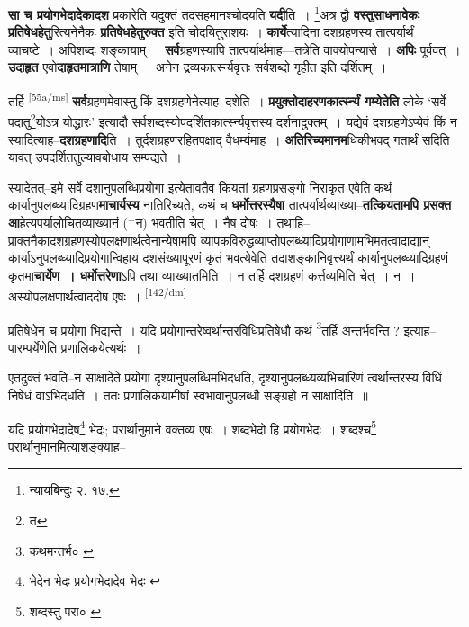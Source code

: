 \documentclass[article,12pt,a4paper]{memoir}
\newcommand{\add}[1]{($^{+}$#1)}
\begin{document}
	  \pstart \textbf{सा च प्रयोगभेदादेकादश} प्रकारेति यदुक्तं तदसहमानश्चोदयति \textbf{यदी}ति । \footnote{न्यायबिन्दुः २. १७.}अत्र द्वौ \textbf{वस्तुसाधनावेकः प्रतिषेधहेतु}रित्यनेनैकः \textbf{प्रतिषेधहेतुरुक्त} इति चोदयितुराशयः । \textbf{कार्ये}त्यादिना दशग्रहणस्य तात्पर्यार्थं व्याचष्टे । अपिशब्दः शङ्कायाम् । \textbf{सर्व}ग्रहणस्यापि तात्पर्यार्थमाह—तत्रेति वाक्योपन्यासे । \textbf{अपिः} पूर्ववत् । \textbf{उदाहृत} एवो\textbf{दाहृतमात्राणि} तेषाम् । अनेन द्रव्यकार्त्स्न्यवृत्तः सर्वशब्दो गृहीत इति दर्शितम् ।
	\pend
      

	  \pstart तर्हि \leavevmode\textsuperscript{\rmlatinfont\tiny [55a/ms]} \textbf{सर्व}ग्रहणमेवास्तु किं दशग्रहणेनेत्याह--दशेति । \textbf{प्रयुक्तोदाहरणकार्त्स्न्यं गम्येतेति} लोके ‘सर्वे पदातु\footnote{त}योऽत्र योद्धारः’ इत्यादौ सर्वशब्दस्योपदर्शितकार्त्स्न्यवृत्तस्य दर्शनादुक्तम् । यद्येवं दशग्रहणेऽप्येवं किं न स्यादित्याह--\textbf{दशग्रहणादि}ति । तुर्दशग्रहणरहितपक्षाद् वैधर्म्यमाह । \textbf{अतिरिच्यमानम}धिकीभवद् गतार्थं सदिति यावत् उपदर्शिततुल्यावबोधाय सम्पद्यते ।
	\pend
      

	  \pstart स्यादेतत्--इमे सर्वे दशानुपलब्धिप्रयोगा इत्येतावतैव कियतां ग्रहणप्रसङ्गो निराकृत एवेति कथं कार्यानुपलब्ध्यादिग्रहण\textbf{माचार्यस्य} नातिरिच्यते, कथं च \textbf{धर्मोत्तरस्यैषा} तात्पर्यार्थव्याख्या--\textbf{तत्कियतामपि प्रसक्त आ}हेत्यपर्यालोचितव्याख्यानं \add{न} भवतीति चेत् । नैष दोषः । तथाहि--प्राक्तनैकादशग्रहणस्योपलक्षणार्थत्वेनान्येषामपि व्यापकविरुद्धव्याप्तोपलब्ध्यादिप्रयोगाणामभिमतत्वादाद्यान् कार्याऽनुपलब्ध्यादिप्रयोगान्विहाय दशसंख्यापूरणं कृतं भवत्येवेति तदाशङ्कानिवृत्त्यर्थं कार्यानुपलब्ध्यादिग्रहणं कृतमा\textbf{चार्येण । धर्मोत्तरेणा}ऽपि तथा व्याख्यातमिति । न तर्हि दशग्रहणं कर्त्तव्यमिति चेत् । न । अस्योपलक्षणार्थत्वाददोष एषः ।  \leavevmode\textsuperscript{\rmlatinfont\tiny [142/dm]} 
	  
	प्रतिषेधेन च प्रयोगा भिद्यन्ते । यदि प्रयोगान्तरेष्वर्थान्तरविधिप्रतिषेधौ कथं \footnote{कथमन्तर्भ० \cite{dp-msC}}तर्हि अन्तर्भवन्ति ? इत्याह--पारम्पर्येणेति प्रणालिकयेत्यर्थः । 
	  
	एतदुक्तं भवति--न साक्षादेते प्रयोगा दृश्यानुपलब्धिमभिदधति, दृश्यानुपलब्ध्यव्यभिचारिणं त्वर्थान्तरस्य विधिं निषेधं वाऽभिदधति । ततः प्रणालिकयामीषां स्वभावानुपलब्धौ सङ्ग्रहो न साक्षादिति ॥ 
	  
	यदि प्रयोगभेदादेष\footnote{भेदेन भेदः \cite{dp-msA} \cite{dp-edP} \cite{dp-edH} \cite{dp-edE} \cite{dp-edN} प्रयोगभेदादेव भेदः \cite{dp-msB} \cite{dp-msC}} भेदः; परार्थानुमाने वक्तव्य एषः । शब्दभेदो हि प्रयोगभेदः । शब्दश्च\footnote{शब्दस्तु परा० \cite{dp-msB} \cite{dp-msC}} परार्थानुमानमित्याशङ्क्याह-- 
	  
\end{document}
